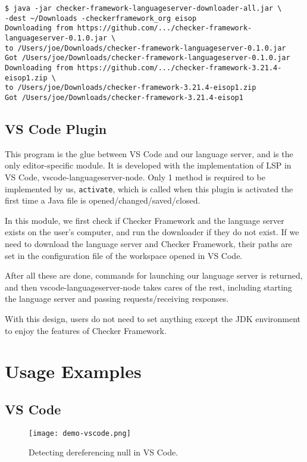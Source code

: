 \documentclass{article}
\begin{document}
\begin{lstlisting}
$ java -jar checker-framework-languageserver-downloader-all.jar \
-dest ~/Downloads -checkerframework_org eisop
Downloading from https://github.com/.../checker-framework-languageserver-0.1.0.jar \
to /Users/joe/Downloads/checker-framework-languageserver-0.1.0.jar
Got /Users/joe/Downloads/checker-framework-languageserver-0.1.0.jar
Downloading from https://github.com/.../checker-framework-3.21.4-eisop1.zip \
to /Users/joe/Downloads/checker-framework-3.21.4-eisop1.zip
Got /Users/joe/Downloads/checker-framework-3.21.4-eisop1
\end{lstlisting}

\subsection{VS Code Plugin}

This program is the glue between VS Code and our language server, and is the
only editor-specific module. It is developed with the implementation of LSP in
VS Code, vscode-languageserver-node\cite{vslsp}. Only 1 method is required to be
implemented by us, \verb|activate|, which is called when this plugin is
activated the first time a Java file is opened/changed/saved/closed.

In this module, we first check if Checker Framework and the language server
exists on the user's computer, and run the downloader if they do not exist. If
we need to download the language server and Checker Framework, their paths are
set in the configuration file of the workspace opened in VS Code.

After all these are done, commands for launching our language server is
returned, and then vscode-languageserver-node takes cares of the rest, including
starting the language server and passing requests/receiving responses.

With this design, users do not need to set anything except the JDK environment
to enjoy the features of Checker Framework.


\section{Usage Examples}

\subsection{VS Code}

\begin{figure}
\centering
\texttt{[image: demo-vscode.png]}
\caption{Detecting dereferencing null in VS Code.}
\label{fig:demo-vscode}
\end{figure}
\end{document}
